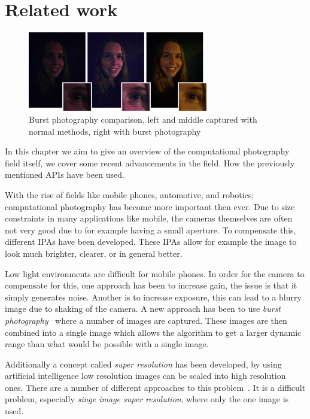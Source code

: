 \chapter{Related work\label{discussion}}
\begin{figure}[ht]
    \begin{center}
        \includegraphics[width=0.70\textwidth]{figures/lowlight.png}
    \end{center}
    \caption{Burst photography comparison, left and middle captured with normal methods, right with burst photography~\cite{hasinoff2016burst}}\label{fig:lowlight}
\end{figure}

In this chapter we aim to give an overview of the computational photography
field itself, we cover some recent advancements in the field. How the
previously mentioned APIs have been used.

With the rise of fields like mobile phones, automotive, and robotics;
computational photography has become more important then ever. Due to size
constraints in many applications like mobile, the cameras themselves are often
not very good due to for example having a small aperture. To compensate this,
different IPAs have been developed. These IPAs allow for example the image to
look much brighter, clearer, or in general better.

Low light environments are difficult for mobile phones. In order for the camera
to compensate for this, one approach has been to increase gain, the issue is
that it simply generates noise. Another is to increase exposure, this can lead
to a blurry image due to shaking of the camera. A new approach has been to use
\textit{burst photography}~\cite{hasinoff2016burst} where a number of images
are captured. These images are then combined into a single image which allows
the algorithm to get a larger dynamic range than what would be possible with a
single image.

Additionally a concept called \textit{super resolution} has been developed, by
using artificial intelligence low resolution images can be scaled into high
resolution ones. There are a number of different approaches to this problem~\cite{yang2019deep, chen2022real}.
It is a difficult problem, especially \textit{singe image super resolution},
where only the one image is used.

